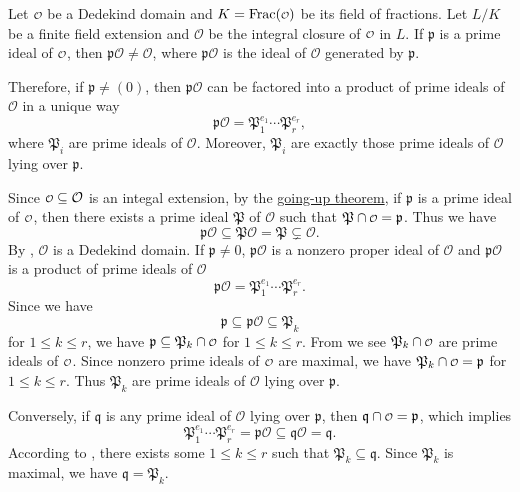 \begin{proposition}{}{}
    Let $\mathcalo$ be a Dedekind domain and $K=\mathrm{Frac}(\mathcalo)$ be its field of fractions. Let $L/K$ be a finite field extension and $\mathcal{O}$ be the integral closure of $\mathcalo$ in $L$. If $\mathfrak{p}$ is a prime ideal of $\mathcalo$, then $\mathfrak{p}\mathcal{O}\ne \mathcal{O}$, where $\mathfrak{p}\mathcal{O}$ is the ideal of $\mathcal{O}$ generated by $\mathfrak{p}$.
    
    Therefore, if $\mathfrak{p}\ne (0)$, then $\mathfrak{p}\mathcal{O}$ can be factored into a product of prime ideals of $\mathcal{O}$ in a unique way 
    \[
    \mathfrak{p}\mathcal{O}=\mathfrak{P}_1^{e_1}\cdots\mathfrak{P}_r^{e_r},
    \]
    where $\mathfrak{P}_i$ are prime ideals of $\mathcal{O}$. Moreover, $\mathfrak{P}_i$ are exactly those prime ideals of $\mathcal{O}$ lying over $\mathfrak{p}$. 
\end{proposition}
\begin{prf}
    Since $\mathcalo \subseteq \mathcal{O}$ is an integal extension, by the \hyperref[th:going_up_and_going_down_theorems]{going-up theorem}, if $\mathfrak{p}$ is a prime ideal of $\mathcalo$, then there exists a prime ideal $\mathfrak{P}$ of $\mathcal{O}$ such that $\mathfrak{P}\cap \mathcalo=\mathfrak{p}$. Thus we have 
    \[
    \mathfrak{p}\mathcal{O}\subseteq \mathfrak{P} \mathcal{O}= \mathfrak{P} \subsetneq \mathcal{O}.
    \]
    By , $\mathcal{O}$ is a Dedekind domain. If $\mathfrak{p}\ne 0$, $\mathfrak{p}\mathcal{O}$ is a nonzero proper ideal of $\mathcal{O}$ and $\mathfrak{p}\mathcal{O}$ is a product of prime ideals of $\mathcal{O}$
    \[
    \mathfrak{p}\mathcal{O}=\mathfrak{P}_1^{e_1}\cdots\mathfrak{P}_r^{e_r}.
    \] 
    Since we have
    \[
        \mathfrak{p}\subseteq \mathfrak{p}\mathcal{O} \subseteq \mathfrak{P}_k
    \]
    for $1\le k\le r$, we have $\mathfrak{p}\subseteq \mathfrak{P}_k\cap \mathcalo$ for $1\le k\le r$. From  we see $\mathfrak{P}_k\cap \mathcalo$ are prime ideals of $\mathcalo$. Since nonzero prime ideals of $\mathcalo$ are maximal, we have $\mathfrak{P}_k\cap \mathcalo=\mathfrak{p}$ for $1\le k\le r$. Thus $\mathfrak{P}_k$ are prime ideals of $\mathcal{O}$ lying over $\mathfrak{p}$.

    Conversely, if $\mathfrak{q}$ is any prime ideal of $\mathcal{O}$ lying over $\mathfrak{p}$, then $\mathfrak{q}\cap \mathcalo=\mathfrak{p}$, which implies 
    \[
        \mathfrak{P}_1^{e_1}\cdots\mathfrak{P}_r^{e_r}=\mathfrak{p}\mathcal{O}\subseteq \mathfrak{q} \mathcal{O}=\mathfrak{q}.
    \]
    According to , there exists some $1\le k\le r$ such that $\mathfrak{P}_k\subseteq \mathfrak{q}$. Since $\mathfrak{P}_k$ is maximal, we have $\mathfrak{q}=\mathfrak{P}_k$. 
\end{prf}

